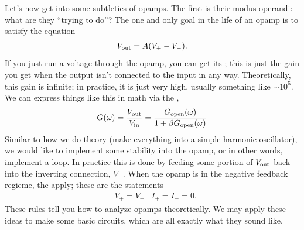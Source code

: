 \documentclass[11pt]{article}
\begin{document}
Let's now get into some subtleties of opamps. The first is
their modus operandi: what are they ``trying to do''? The
one and only goal in the life of an opamp is to satisfy
the equation
\begin{align*}
	V_{\rm out} = A (V_+ - V_-).
\end{align*}
If you just run a voltage through the opamp, you can
get its ; this is just the
gain you get when the output isn't connected to the
input in any way. Theoretically, this gain is infinite;
in practice, it is just very high, usually something like $\sim 10^5$.
We can express things like this in math via the
,
\begin{align*}
	G(\omega) = \frac{V_{\rm out}}{V_{\rm in}} = \frac{G_{\rm open}(\omega)}{1 + \beta G_{\rm open}(\omega)}
\end{align*}
Similar to how we do theory (make everything into a simple
harmonic oscillator), we would like to implement some stability
into the opamp, or in other words, implement a  loop.
In practice this is done by feeding some portion of $V_{\rm out}$
back into the inverting connection, $V_-$. When the opamp
is in the negative feedback regieme, the 
apply; these are the statements
\begin{align*}
	& V_+ = V_-
	& I_+ = I_- = 0.
\end{align*}
These rules tell you how to analyze opamps theoretically.
We may apply these ideas to make some basic circuits, which
are all exactly what they sound like.
\end{document}
